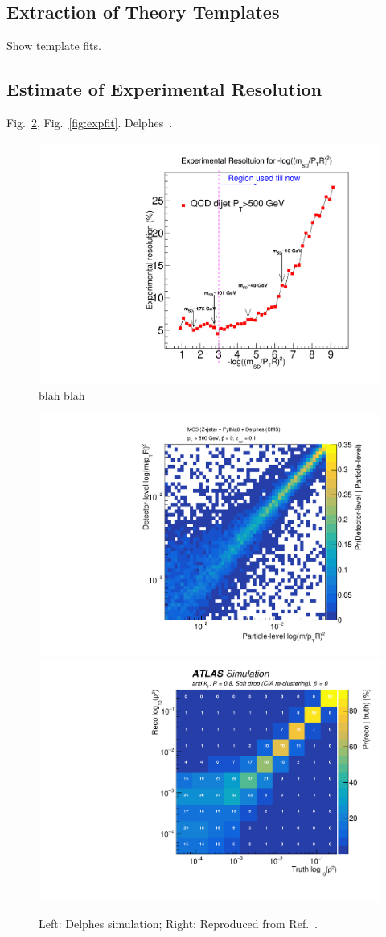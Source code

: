 
\subsection{Extraction of Theory Templates}
\label{sec:templates}


	Show template fits.


\subsection{Estimate of Experimental Resolution}


	Fig.~\ref{fig:expres}, Fig.~\ref{fig:expfit}.  Delphes~\cite{deFavereau:2013fsa}.

\begin{figure}[h!]
\begin{center}
\includegraphics[width = 0.49\columnwidth]{figures/Experimental_Resolution_logrho.pdf}
\end{center}
\caption{blah blah}
\label{fig:res}
\end{figure}

\begin{figure}[h!]
\begin{center}
\includegraphics[width = 0.49\columnwidth]{figures/SD_resolution.pdf}\includegraphics[width = 0.49\columnwidth]{figures/figaux_03a.pdf}
\end{center}
\caption{Left: Delphes simulation; Right: Reproduced from Ref.~\cite{Aaboud:2017qwh}.}
\label{fig:expres}
\end{figure}


